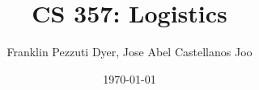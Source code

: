 



\title{CS 357: Logistics}  
\author{Franklin Pezzuti Dyer, Jose Abel Castellanos Joo}
\date{\today} 

\frame{\titlepage} 






